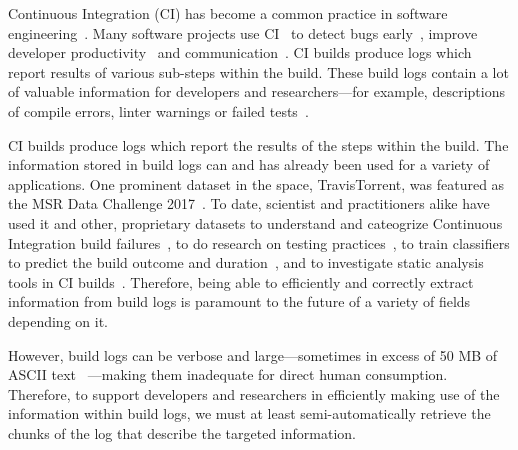 



Continuous Integration (CI) has become a common practice in software
engineering~\cite{hilton2016usage}.  Many software projects use
CI~\cite{hilton2016usage,staahl2014modeling,beller2017oops} to detect
bugs early~\cite{vasilescu2015quality,duvall2007continuous}, improve
developer productivity~\cite{miller2008hundred,hilton2016usage} and
communication~\cite{downs2012ambient}.  CI builds produce logs which
report results of various sub-steps within the build.  These build logs
contain a lot of valuable information for developers and researchers---for
example, descriptions of compile errors, linter warnings or failed
tests~\cite{beller2017oops,seo2014programmers,vassallo2017a-tale}.

CI builds produce logs which report the results of the steps within the build. The information stored in build logs can and has
already been used for a variety of applications. One prominent dataset
in the space, TravisTorrent, was featured as the MSR Data Challenge
2017~\cite{msr17challenge}. To date, scientist and practitioners alike
have used it and other, proprietary datasets to understand and
cateogrize Continuous Integration build
failures~\cite{islam2017insights}, to do research on testing
practices~\cite{orellana2017differences}, to train classifiers to
predict the build outcome and
duration~\cite{ni2017cost,bisong2017built,machalica2019predictive},
and to investigate static analysis tools in CI
builds~\cite{zampetti2017open}. Therefore, being able to efficiently
and correctly extract information from build logs is paramount to the
future of a variety of fields depending on it.

However, build logs can be verbose and large---sometimes in excess of
50 MB of ASCII text ~\cite{beller2017oops}---making them inadequate
for direct human consumption. Therefore, to support developers and
researchers in efficiently making use of the information within build
logs, we must at least semi-automatically retrieve the chunks of the
log that describe the targeted information.


